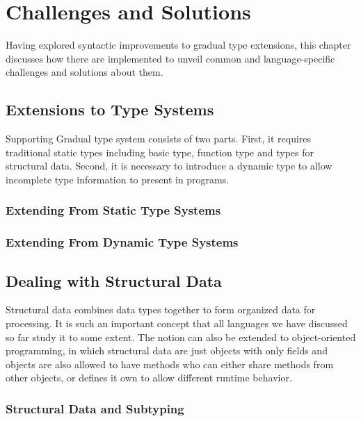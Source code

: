 
\renewcommand{\thechapter}{3}

\chapter{Challenges and Solutions}

Having explored syntactic improvements to gradual type extensions,
this chapter discusses how there are implemented to unveil common and language-specific
challenges and solutions about them.

\section{Extensions to Type Systems}

Supporting Gradual type system consists of two parts.
First, it requires traditional static types including basic type, function type and types for structural data.
Second, it is necessary to introduce a dynamic type to allow incomplete type information to present in programs.

\subsection{Extending From Static Type Systems}

\subsection{Extending From Dynamic Type Systems}

\section{Dealing with Structural Data}

Structural data combines data types together to form organized data for processing.
It is such an important concept that all languages we have discussed so far study
it to some extent. The notion can also be extended to object-oriented programming,
in which structural data are just objects with only fields and objects are also
allowed to have methods who can either share methods from other objects,
or defines it own to allow different runtime behavior.

\subsection{Structural Data and Subtyping}

